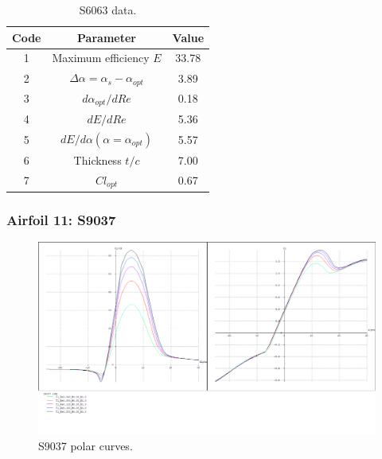 \documentclass[../TFG_Annex.tex]{subfiles}
\begin{document}
\begin{table}[h!]
	\centering
	\begin{tabular}{c|c|c}
		Code & Parameter                                    & Value  \\ \hline
		1    & Maximum efficiency $E$                      &     33.78        \\
		2    & $\Delta \alpha=\alpha_{s}-\alpha_{opt}$    &           3.89          \\
		3    & ${d\alpha_{opt}}/{dRe}$                     &             0.18     \\
		4    & ${dE}/{dRe}$                                &        5.36         \\
		5    & ${dE}/{d \alpha} (\alpha=\alpha_{opt})$      &           5.57        \\
		6    & Thickness $t/c$                            &              7.00      \\
		7    & $Cl_{opt}$  &   0.67
	\end{tabular}
	\caption{S6063 data.}
	\label{tab:Airf10}
\end{table}





\newpage
\subsubsection{Airfoil 11: S9037}


\begin{figure}[h!]
	\centering
	\includegraphics[width=1\linewidth]{"../../04-Airfoil selection/Imatges airfoils/11-S9037"}
	\caption{S9037 polar curves.}
	\label{fig:11-s9037}
\end{figure}
\end{document}
